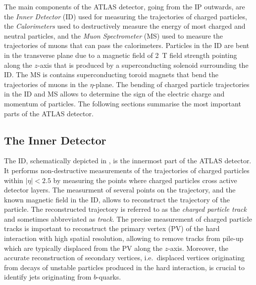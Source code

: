 The main components of the ATLAS detector, going from the IP outwards, are the
\emph{Inner Detector} (ID) used for measuring the trajectories of charged
particles, the \emph{Calorimeters} used to destructively measure the energy of
most charged and neutral particles, and the \emph{Muon Spectrometer} (MS) used
to measure the trajectories of muons that can pass the calorimeters. Particles
in the ID are bent in the transverse plane due to a magnetic field of
\SI{2}{\tesla} field strength pointing along the $z$-axis that is produced by a
superconducting solenoid surrounding the ID.  The MS is contains superconducting
toroid magnets that bend the trajectories of muons in the $\eta$-plane. The
bending of charged particle trajectories in the ID and MS allows to determine
the sign of the electric charge and momentum of particles. The following
sections summarise the most important parts of the ATLAS detector.


\subsection{The Inner Detector}

The ID, schematically depicted in , is the
innermost part of the ATLAS detector. It performs non-destructive measurements
of the trajectories of charged particles within $|\eta| < 2.5$ by measuring the
points where charged particles cross active detector layers. The measurment of
several points on the trajectory, and the known magnetic field in the ID, allows
to reconstruct the trajectory of the particle. The reconstructed trajectory is
referred to as the \emph{charged particle track} and sometimes abbreviated as
\emph{track}. The precise measurement of charged particle tracks is important to
reconstruct the primary vertex (PV) of the hard interaction with high spatial
resolution, allowing to remove tracks from pile-up which are typically displaced
from the PV along the $z$-axis. Moreover, the accurate reconstruction of
secondary vertices, i.e.\ displaced vertices originating from decays of unstable
particles produced in the hard interaction, is crucial to identify jets
originating from $b$-quarks.%

